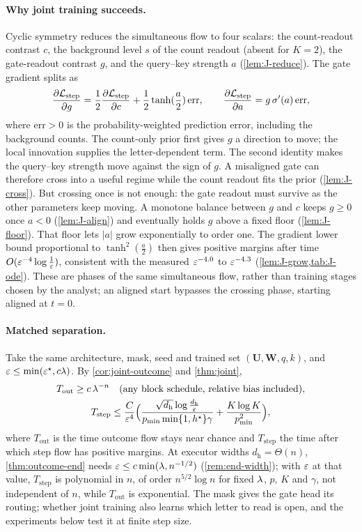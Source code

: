 \paragraph{Why joint training succeeds.} Cyclic symmetry reduces the simultaneous flow to four scalars: the count-readout contrast $c$,
the background level $s$ of the count readout (absent for $K=2$), the gate-readout contrast $g$, and the query--key strength $a$
(\cref{lem:J-reduce}). The gate gradient splits as
\[
 \pd{\Lstep}{g}=\tfrac{1}{2}\pd{\Lstep}{c}+\tfrac{1}{2}\tanh(\frac{a}{2})\,\mathrm{err},\qquad \pd{\Lstep}{a}=g\,\sigma'(a)\,\mathrm{err},
\]
where $\mathrm{err}>0$ is the probability-weighted prediction error, including the background counts. The count-only prior first
gives $g$ a direction to move; the local innovation supplies the letter-dependent term. The second identity makes the query--key
strength move against the sign of $g$. A misaligned gate can therefore cross into a useful regime while the count readout fits the
prior (\cref{lem:J-cross}). But crossing once is not enough: the gate readout must survive as the other parameters keep moving.
A monotone balance between $g$ and $c$ keeps $g\ge0$ once $a<0$ (\cref{lem:J-align}) and eventually holds $g$ above a fixed floor
(\cref{lem:J-floor}). That floor lets $|a|$ grow exponentially to order one. The gradient lower bound proportional to
$\tanh^2(\frac{a}{2})$ then gives positive margins after time $O(\varepsilon^{-4}\log\frac{1}{\varepsilon})$, consistent with the measured
$\varepsilon^{-4.0}$ to $\varepsilon^{-4.3}$ (\cref{lem:J-grow,tab:J-ode}). These are phases of the same simultaneous flow, rather than
training stages chosen by the analyst; an aligned start bypasses the crossing phase, starting aligned at $t=0$.

\paragraph{Matched separation.} Take the same architecture, mask, seed and trained set $(\mathbf U,\mathbf W,q,k)$, and $\varepsilon\le\min(\varepsilon^\star,c\lambda)$.
By \cref{cor:joint-outcome} and \cref{thm:joint},
\begin{gather*}
 T_{\mathrm{out}}\ge c\,\lambda^{-n}\quad\text{(any block schedule, relative bias included)},\\
 T_{\mathrm{step}}\le\frac{C}{\varepsilon^4}\Bigl(\frac{\sqrt{d_{\mathrm h}}\log\frac{d_{\mathrm h}}{\varepsilon}}{p_{\min}\min\{1,h^\star\}\gamma}+\frac{K\log K}{p_{\min}^2}\Bigr),
\end{gather*}
where $T_{\mathrm{out}}$ is the time outcome flow stays near chance and $T_{\mathrm{step}}$ the time after which step flow has positive margins. At executor
widths $d_{\mathrm h}=\Theta(n)$, \cref{thm:outcome-end} needs $\varepsilon\le c\min(\lambda,n^{-1/2})$ (\cref{rem:end-width}); with $\varepsilon$ at that value, $T_{\mathrm{step}}$ is polynomial
in $n$, of order $n^{5/2}\log n$ for fixed $\lambda$, $p$, $K$ and $\gamma$, not independent of $n$, while $T_{\mathrm{out}}$ is exponential. The mask gives the gate head its routing;
whether joint training also learns which letter to read is open, and the experiments below test it at finite step size.

